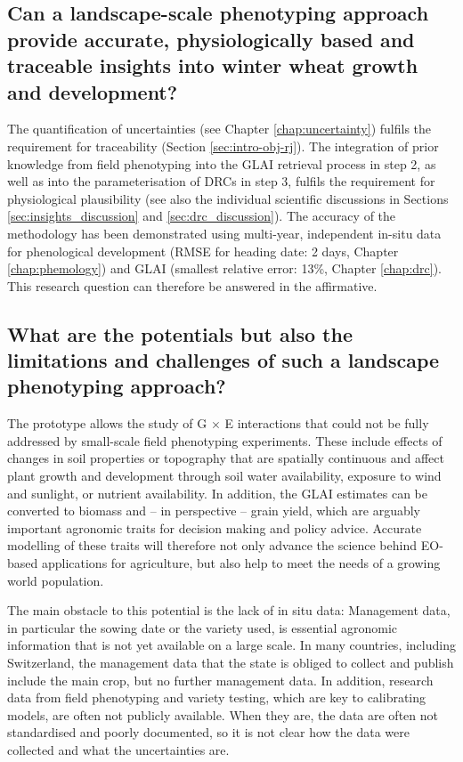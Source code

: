 \subsection{Can a landscape-scale phenotyping approach provide accurate, physiologically based and traceable insights into winter wheat growth and development?}
The quantification of uncertainties (see Chapter \ref{chap:uncertainty}) fulfils the requirement for traceability (Section \ref{sec:intro-obj-rj}). The integration of prior knowledge from field phenotyping into the \gls{GLAI} retrieval process in step 2, as well as into the parameterisation of \gls{DRC}s in step 3, fulfils the requirement for physiological plausibility (see also the individual scientific discussions in Sections \ref{sec:insights_discussion} and \ref{sec:drc_discussion}). The accuracy of the methodology has been demonstrated using multi-year, independent in-situ data for phenological development (RMSE for heading date: 2 days, Chapter \ref{chap:phemology}) and GLAI (smallest relative error: 13\%, Chapter \ref{chap:drc}). This research question can therefore be answered in the affirmative.

\subsection{What are the potentials but also the limitations and challenges of such a landscape phenotyping approach?}

The prototype allows the study of G $\times$ E interactions that could not be fully addressed by small-scale field phenotyping experiments. These include effects of changes in soil properties or topography that are spatially continuous and affect plant growth and development through soil water availability, exposure to wind and sunlight, or nutrient availability. In addition, the \gls{GLAI} estimates can be converted to biomass \citep{aase_relationship_1978} and -- in perspective -- grain yield, which are arguably important agronomic traits for decision making and policy advice. Accurate modelling of these traits will therefore not only advance the science behind \gls{EO}-based applications for agriculture, but also help to meet the needs of a growing world population.

The main obstacle to this potential is the lack of in situ data: Management data, in particular the sowing date or the variety used, is essential agronomic information that is not yet available on a large scale. In many countries, including Switzerland, the management data that the state is obliged to collect and publish include the main crop, but no further management data. In addition, research data from field phenotyping and variety testing, which are key to calibrating models, are often not publicly available. When they are, the data are often not standardised and poorly documented, so it is not clear how the data were collected and what the uncertainties are.

